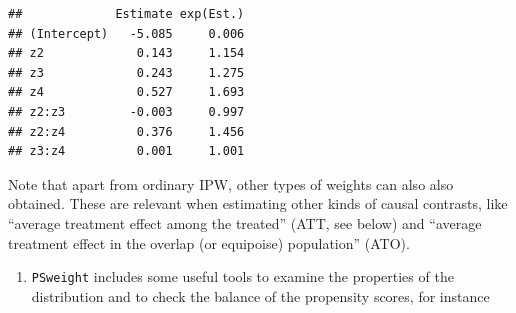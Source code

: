 \documentclass[
]{book}
\newenvironment{Shaded}{\begin{snugshade}}{\end{snugshade}}
\newcommand{\AttributeTok}[1]{\textcolor[rgb]{0.13,0.29,0.53}{#1}}
\newcommand{\DecValTok}[1]{\textcolor[rgb]{0.00,0.00,0.81}{#1}}
\newcommand{\FunctionTok}[1]{\textcolor[rgb]{0.13,0.29,0.53}{\textbf{#1}}}
\newcommand{\NormalTok}[1]{#1}
\newcommand{\OtherTok}[1]{\textcolor[rgb]{0.56,0.35,0.01}{#1}}
\newcommand{\SpecialCharTok}[1]{\textcolor[rgb]{0.81,0.36,0.00}{\textbf{#1}}}
\newcommand{\StringTok}[1]{\textcolor[rgb]{0.31,0.60,0.02}{#1}}
\providecommand{\tightlist}{%
  \setlength{\itemsep}{0pt}\setlength{\parskip}{0pt}}
\begin{document}
\begin{verbatim}
##             Estimate exp(Est.)
## (Intercept)   -5.085     0.006
## z2             0.143     1.154
## z3             0.243     1.275
## z4             0.527     1.693
## z2:z3         -0.003     0.997
## z2:z4          0.376     1.456
## z3:z4          0.001     1.001
\end{verbatim}

\begin{Shaded}
\end{Shaded}

Note that apart from ordinary IPW, other types of
weights can also also
obtained. These are relevant when estimating other
kinds of causal
contrasts, like ``average treatment effect among the treated''
(ATT, see below) and ``average treatment effect in the overlap
(or equipoise) population'' (ATO).

\begin{enumerate}
\def\labelenumi{\arabic{enumi}.}
\setcounter{enumi}{1}
\tightlist
\item
  \texttt{PSweight} includes some useful tools to examine the
  properties of the distribution and to check the balance
  of the propensity scores, for instance
\end{enumerate}
\end{document}
